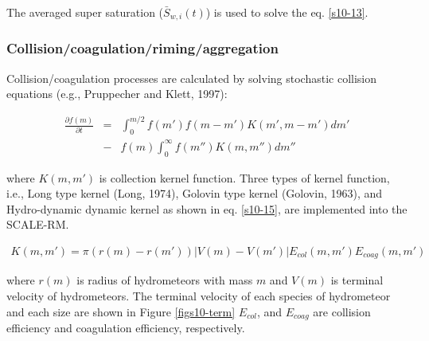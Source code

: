 The averaged super saturation ($\bar{S}_{w,i}(t)$) is used to solve the eq. \ref{s10-13}.

\subsubsection{Collision/coagulation/riming/aggregation}
Collision/coagulation processes are calculated by solving stochastic collision equations (e.g., Pruppecher and Klett, 1997)\cite{pk_1997}:

\begin{eqnarray}
\frac{\partial f(m)}{\partial t}&=&\int_0^{m/2}f(m')f(m-m')K(m',m-m')dm' \nonumber\\
&-&f(m)\int_0^{\infty}f(m'')K(m,m'')dm''\label{s10-14}
\end{eqnarray}

where $K(m,m')$ is collection kernel function. Three types of kernel function, i.e., Long type kernel (Long, 1974\cite{long_1974}), Golovin type kernel (Golovin, 1963\cite{Golovin_1963}), and Hydro-dynamic dynamic kernel as shown in eq. \ref{s10-15}, are implemented into the SCALE-RM.

\begin{eqnarray}
K(m,m')=\pi(r(m)-r(m'))\left| V(m)-V(m')\right |E_{col}(m,m')E_{coag}(m,m')\label{s10-15}
\end{eqnarray}

where $r(m)$ is radius of hydrometeors with mass $m$ and $V(m)$ is terminal velocity of hydrometeors. The terminal velocity of each species of hydrometeor and each size are shown in Figure \ref{figs10-term} $E_{col}$, and $E_{coag}$ are collision efficiency and coagulation efficiency, respectively.\\

